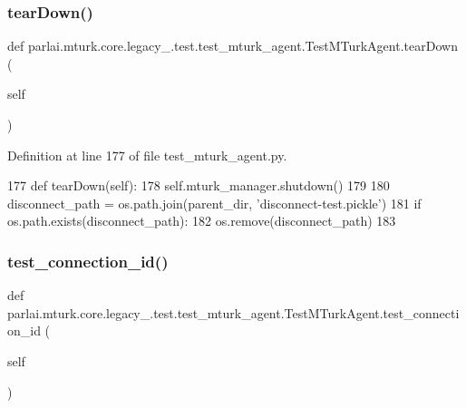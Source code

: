 \subsubsection{\texorpdfstring{tear\+Down()}{tearDown()}}
{\footnotesize\ttfamily def parlai.\+mturk.\+core.\+legacy\+\_.\+test.\+test\+\_\+mturk\+\_\+agent.\+Test\+M\+Turk\+Agent.\+tear\+Down (\begin{DoxyParamCaption}\item[{}]{self }\end{DoxyParamCaption})}



Definition at line 177 of file test\+\_\+mturk\+\_\+agent.\+py.


\begin{DoxyCode}
177     \textcolor{keyword}{def }tearDown(self):
178         self.mturk\_manager.shutdown()
179 
180         disconnect\_path = os.path.join(parent\_dir, \textcolor{stringliteral}{'disconnect-test.pickle'})
181         \textcolor{keywordflow}{if} os.path.exists(disconnect\_path):
182             os.remove(disconnect\_path)
183 
\end{DoxyCode}
\mbox{\label{classparlai_1_1mturk_1_1core_1_1legacy__2018_1_1test_1_1test__mturk__agent_1_1TestMTurkAgent_a37efa552f4eceee94c74a3203e1a629c}} 
\subsubsection{\texorpdfstring{test\+\_\+connection\+\_\+id()}{test\_connection\_id()}}
{\footnotesize\ttfamily def parlai.\+mturk.\+core.\+legacy\+\_.\+test.\+test\+\_\+mturk\+\_\+agent.\+Test\+M\+Turk\+Agent.\+test\+\_\+connection\+\_\+id (\begin{DoxyParamCaption}\item[{}]{self }\end{DoxyParamCaption})}

